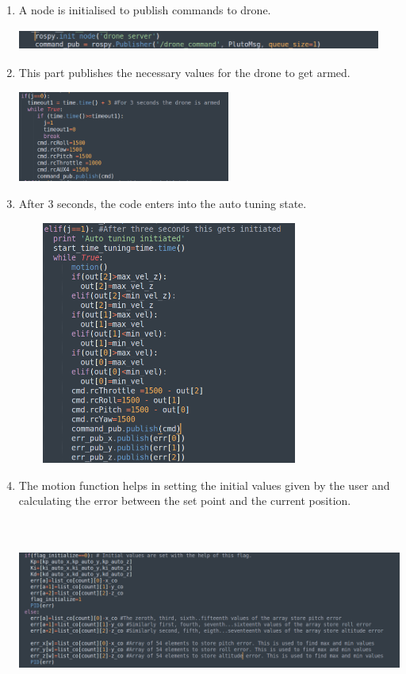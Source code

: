 \documentclass[a4paper,12pt,oneside]{book}
\begin{document}
\begin{enumerate}
\item A node is initialised to publish commands to drone.


\includegraphics[width = 12cm , height= 0.7cm]{Drone_pub_5.png}

\item This part publishes the necessary values for the drone to get armed.


\includegraphics[width = 7cm , height= 3cm]{Arm_4.png}

\item After 3 seconds, the code enters into the auto tuning state.

\includegraphics[width = 10cm , height= 8cm]{Auto_init_6.png}

\item The motion function helps in setting the initial values given by the user and calculating the error between the set point and the current position.

\includegraphics[width = 14cm , height= 6cm]{motion_fn_7.png}



\end{enumerate}
\end{document}
